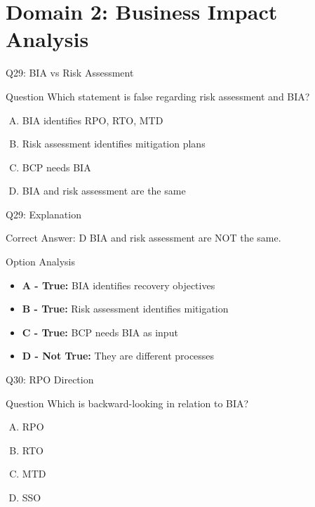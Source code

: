 \documentclass{beamer}
\begin{document}
	\section{Domain 2: Business Impact Analysis}
	
	\begin{frame}{Q29: BIA vs Risk Assessment}
		\begin{block}{Question}
			Which statement is false regarding risk assessment and BIA?
		\end{block}
		\begin{enumerate}[(A)]
			\item BIA identifies RPO, RTO, MTD
			\item Risk assessment identifies mitigation plans
			\item BCP needs BIA
			\item BIA and risk assessment are the same
		\end{enumerate}
	\end{frame}
	
	\begin{frame}{Q29: Explanation}
		\begin{block}{Correct Answer: D}
			BIA and risk assessment are NOT the same.
		\end{block}
		\begin{block}{Option Analysis}
			\begin{itemize}
				\item \textbf{A - True:} BIA identifies recovery objectives
				\item \textbf{B - True:} Risk assessment identifies mitigation
				\item \textbf{C - True:} BCP needs BIA as input
				\item \textbf{D - Not True:} They are different processes
			\end{itemize}
		\end{block}
	\end{frame}
	
	\begin{frame}{Q30: RPO Direction}
		\begin{block}{Question}
			Which is backward-looking in relation to BIA?
		\end{block}
		\begin{enumerate}[(A)]
			\item RPO
			\item RTO
			\item MTD
			\item SSO
		\end{enumerate}
	\end{frame}
	
\end{document}
